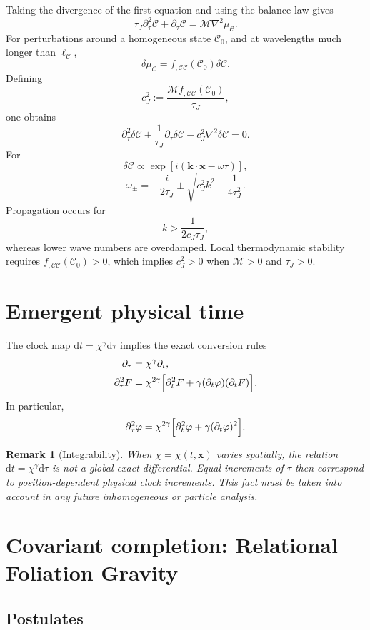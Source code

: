 \documentclass[11pt,a4paper]{article}
\newtheorem{remark}[axiom]{Remark}
\newcommand{\C}{\mathcal{C}}
\renewcommand{\dd}{\mathrm{d}}
\begin{document}
Taking the divergence of the first equation and using the balance law gives
\[
\boxed{
\tau_J\partial_\tau^2\C+\partial_\tau\C
=
\mathcal M\nabla^2\mu_{\mathcal C}.
}
\]
For perturbations around a homogeneous state \(\C_0\), and at wavelengths much
longer than \(\ell_{\mathcal C}\),
\[
\delta\mu_{\mathcal C}
=
f_{,\C\C}(\C_0)\delta\C.
\]
Defining
\[
c_J^2
:=
\frac{\mathcal M f_{,\C\C}(\C_0)}{\tau_J},
\]
one obtains
\[
\partial_\tau^2\delta\C
+\frac{1}{\tau_J}\partial_\tau\delta\C
-c_J^2\nabla^2\delta\C=0.
\]
For
\[
\delta\C\propto
\exp\!\left[i(\mathbf k\cdot\mathbf x-\omega\tau)\right],
\]
\[
\omega_\pm
=
-\frac{i}{2\tau_J}
\pm
\sqrt{c_J^2k^2-\frac{1}{4\tau_J^2}}.
\]
Propagation occurs for
\[
k>\frac{1}{2c_J\tau_J},
\]
whereas lower wave numbers are overdamped. Local thermodynamic stability
requires \(f_{,\C\C}(\C_0)>0\), which implies \(c_J^2>0\) when
\(\mathcal M>0\) and \(\tau_J>0\).

\section{Emergent physical time}

The clock map \(\dd t=\chi^\gamma\dd\tau\) implies the exact conversion rules
\begin{align}
\partial_\tau&=\chi^\gamma\partial_t,\\
\partial_\tau^2F&=\chi^{2\gamma}\Bigl[\partial_t^2F+\gamma(\partial_t\varphi)(\partial_tF)\Bigr].
\end{align}
In particular,
\[
\partial_\tau^2\varphi=\chi^{2\gamma}\Bigl[\partial_t^2\varphi+\gamma(\partial_t\varphi)^2\Bigr].
\]

\begin{remark}[Integrability]
When \(\chi=\chi(t,\mathbf{x})\) varies spatially, the relation \(\dd t=\chi^\gamma\dd\tau\) is not a global exact differential. Equal increments of \(\tau\) then correspond to position-dependent physical clock increments. This fact must be taken into account in any future inhomogeneous or particle analysis.
\end{remark}

\section{Covariant completion: Relational Foliation Gravity}

\subsection{Postulates}
\end{document}
